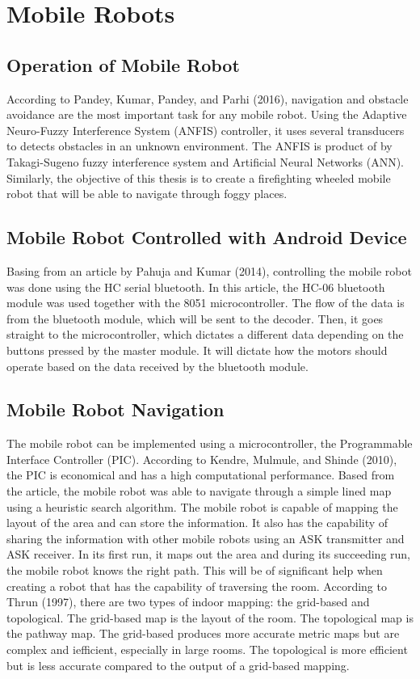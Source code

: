\section{ Mobile Robots}
\subsection{ Operation of Mobile Robot }
	
	According to Pandey, Kumar, Pandey, and Parhi (2016), navigation and obstacle avoidance are the most important task for any mobile robot. Using the Adaptive Neuro-Fuzzy Interference System (ANFIS) controller, it uses several transducers to detects obstacles in an unknown environment. The ANFIS is product of by Takagi-Sugeno fuzzy interference system and Artificial Neural Networks (ANN). Similarly, the objective of this thesis is to create a firefighting wheeled mobile robot that will be able to navigate through foggy places. 

\subsection{ Mobile Robot Controlled with Android Device}

	Basing from an article by Pahuja and Kumar (2014), controlling the mobile robot was done using the HC serial bluetooth. In this article, the HC-06 bluetooth module was used together with the 8051 microcontroller. The flow of the data is from the bluetooth module, which will be sent to the decoder. Then, it goes straight to the microcontroller, which dictates a different data depending on the buttons pressed by the master module. It will dictate how the motors should operate based on the data received by the bluetooth module.

\subsection{ Mobile Robot Navigation}

	The mobile robot can be implemented using a microcontroller, the Programmable Interface Controller (PIC). According to Kendre, Mulmule, and Shinde (2010), the PIC is economical and has a high computational performance. Based from the article, the mobile robot was able to navigate through a simple lined map using a heuristic search algorithm. The mobile robot is capable of mapping the layout of the area and can store the information. It also has the capability of sharing the information with other mobile robots using an ASK transmitter and ASK receiver. In its first run, it maps out the area and during its succeeding run, the mobile robot knows the right path. This will be of significant help when creating a robot that has the capability of traversing the room.
According to Thrun (1997), there are two types of indoor mapping: the grid-based and topological. The grid-based map is the layout of the room. The topological map is the pathway map. The grid-based produces more accurate metric maps but are complex and iefficient, especially in large rooms.  The topological is more efficient but is less accurate compared to the output of a grid-based mapping.

